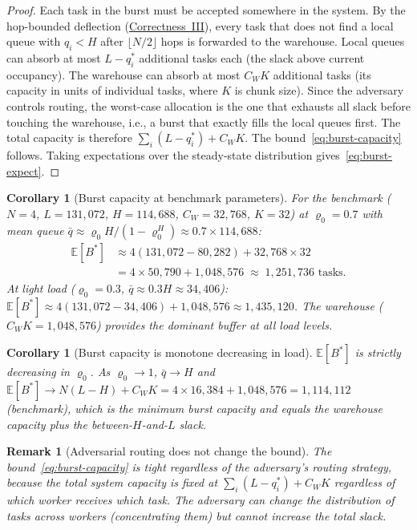 \documentclass[11pt,a4paper]{article}
\newtheorem{corollary}[theorem]{Corollary}
\newtheorem{remark}{Remark}[section]
\newcommand{\rhozero}{\varrho_0}
\newcommand{\qbar}{\bar{q}}
\begin{document}
\begin{proof}
Each task in the burst must be accepted somewhere in the system.
By the hop-bounded deflection (\hyperref[chap:livelock]{Correctness~III}),
every task that does not find a local queue with $q_i < H$ after
$\lfloor N/2 \rfloor$ hops is forwarded to the warehouse.
Local queues can absorb at most $L - q_i^*$ additional tasks each
(the slack above current occupancy).
The warehouse can absorb at most $C_W K$ additional tasks
(its capacity in units of individual tasks, where $K$ is chunk size).
Since the adversary controls routing, the worst-case allocation is the
one that exhausts all slack before touching the warehouse,
i.e., a burst that exactly fills the local queues first.
The total capacity is therefore $\sum_i(L-q_i^*) + C_W K$.
The bound~\eqref{eq:burst-capacity} follows.
Taking expectations over the steady-state distribution gives~\eqref{eq:burst-expect}.
\end{proof}

\begin{corollary}[Burst capacity at benchmark parameters]
\label{cor:burst-bench}
For the benchmark ($N=4$, $L=131{,}072$, $H=114{,}688$, $C_W=32{,}768$, $K=32$)
at $\rhozero = 0.7$ with mean queue $\qbar \approx \rhozero H/(1-\rhozero^H)
\approx 0.7 \times 114{,}688$:
\begin{align*}
  \mathbb{E}[B^*]
  &\approx 4(131{,}072 - 80{,}282) + 32{,}768 \times 32 \\
  &= 4 \times 50{,}790 + 1{,}048{,}576
  \;\approx\; 1{,}251{,}736 \text{ tasks}.
\end{align*}
At light load ($\rhozero = 0.3$, $\qbar \approx 0.3H \approx 34{,}406$):
$\mathbb{E}[B^*] \approx 4(131{,}072 - 34{,}406) + 1{,}048{,}576 \approx 1{,}435{,}120$.
The warehouse ($C_W K = 1{,}048{,}576$) provides the dominant buffer at
all load levels.
\end{corollary}

\begin{corollary}[Burst capacity is monotone decreasing in load]
\label{cor:burst-mono}
$\mathbb{E}[B^*]$ is strictly decreasing in $\rhozero$.
As $\rhozero \to 1$, $\qbar \to H$ and
$\mathbb{E}[B^*] \to N(L-H) + C_W K = 4 \times 16{,}384 + 1{,}048{,}576 = 1{,}114{,}112$
(benchmark), which is the minimum burst capacity and equals the warehouse
capacity plus the between-$H$-and-$L$ slack.
\end{corollary}

\begin{remark}[Adversarial routing does not change the bound]
The bound~\eqref{eq:burst-capacity} is tight regardless of the adversary's
routing strategy, because the total system capacity is fixed at
$\sum_i(L-q_i^*) + C_WK$ regardless of which worker receives which task.
The adversary can change the \emph{distribution} of tasks across workers
(concentrating them) but cannot increase the total slack.
\end{remark}
\end{document}
